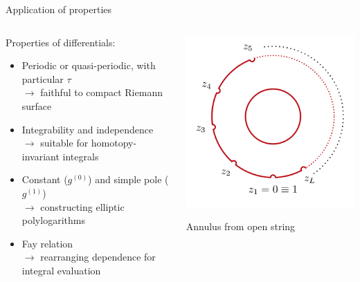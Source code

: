 \documentclass[11pt,aspectratio=169]{beamer}
\begin{document}
\begin{frame}{Application of properties}
    \begin{columns}
        \begin{column}{0.5\textwidth}
            Properties of differentials:
            \begin{itemize}
                \item Periodic or quasi-periodic, with particular $\tau$ \\
                $\rightarrow$ faithful to compact Riemann surface
                \item Integrability and independence \\
                $\rightarrow$ suitable for homotopy-invariant integrals
                \item Constant ($g^{(0)}$) and simple pole ($g^{(1)}$) \\
                $\rightarrow$ constructing elliptic polylogarithms
                \item Fay relation \\
                $\rightarrow$ rearranging dependence for integral evaluation
            \end{itemize}
        \end{column}
        \begin{column}{0.45\textwidth}
            \center{}
            \includegraphics[width=0.7\columnwidth]{assets/Annulus.png}

            \tiny Annulus from open string

            \cite{Broedel_2022}
        \end{column}
    \end{columns}
\end{frame}
\end{document}
